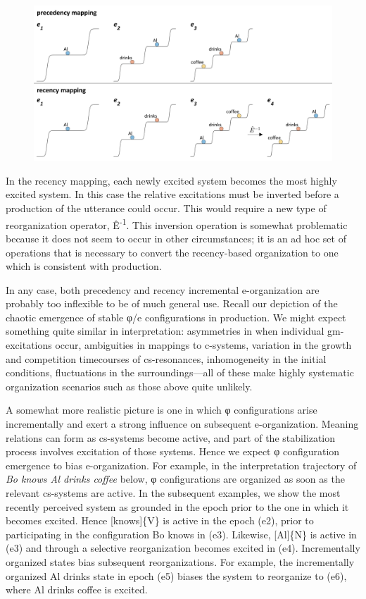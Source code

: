   
\begin{figure}
\includegraphics[width=\textwidth]{figures/Tilsen-img128.png}
\caption{\missingcaption}
\label{fig:6:9}
\end{figure}
 

  In the recency mapping, each newly excited system becomes the most highly excited system. In this case the relative excitations must be inverted before a production of the utterance could occur. This would require a new type of reorganization operator, Ê\textsuperscript{{}-1}. This inversion operation is somewhat problematic because it does not seem to occur in other circumstances; it is an ad hoc set of operations that is necessary to convert the recency-based organization to one which is consistent with production.

  In any case, both precedency and recency incremental e-organization are probably too inflexible to be of much general use. Recall our depiction of the chaotic emergence of stable φ/e configurations in production. We might expect something quite similar in interpretation: asymmetries in when individual gm-excitations occur, ambiguities in mappings to c-systems, variation in the growth and competition timecourses of cs-resonances, inhomogeneity in the initial conditions, fluctuations in the surroundings—all of these make highly systematic organization scenarios such as those above quite unlikely.

  A somewhat more realistic picture is one in which φ configurations arise incrementally and exert a strong influence on subsequent e-organization. Meaning relations can form as cs-systems become active, and part of the stabilization process involves excitation of those systems. Hence we expect φ configuration emergence to bias e-organization. For example, in the interpretation trajectory of \textit{Bo knows Al drinks coffee} below, φ configurations are organized as soon as the relevant cs-systems are active. In the subsequent examples, we show the most recently perceived system as grounded in the epoch prior to the one in which it becomes excited.  Hence [knows]\{V\} is active in the epoch (e2), prior to participating in the configuration {\textbar}Bo knows{\textbar} in (e3). Likewise, [Al]\{N\} is active in (e3) and through a selective reorganization becomes excited in (e4). Incrementally organized states bias subsequent reorganizations. For example, the incrementally organized {\textbar}Al drinks{\textbar} state in epoch (e5) biases the system to reorganize to (e6), where {\textbar}Al drinks coffee{\textbar} is excited. 

